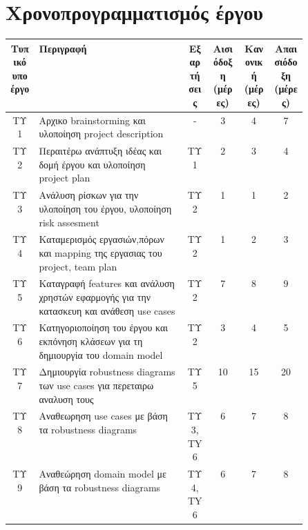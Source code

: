 \documentclass[11pt]{scrartcl} %
\begin{document}
\section{Χρονοπρογραμματισμός έργου}
\begin{table}[ht]
\centering
\resizebox{\textwidth}{!}
{
\Large
\begin{tabular}{|c | p{0.5\linewidth} | c | c | c | c |}
\hline
Τυπικό υποέργο & Περιγραφή                                                                                                         & Εξαρτήσεις & Αισιόδοξη (μέρες) & Κανονική (μέρες) & Απαισιόδοξη (μέρες) \\ \hline
ΤΥ1            & Αρχικο brainstorming και υλοποίηση   project description                                                          & -          & 3         & 4        & 7           \\ \hline
TΥ2            & Περαιτέρω   ανάπτυξη ιδέας και δομή έργου και υλοποίηση project plan                                              & ΤΥ1        & 2         & 3        & 4           \\ \hline
TΥ3            & Ανάλυση ρίσκων   για την υλοποίηση του έργου, υλοποίηση risk assesment                                            & ΤΥ2        & 1         & 1        & 2           \\ \hline
TΥ4            & Καταμερισμός εργασιών,πόρων   και mapping της εργασιας του project, team plan                                     & ΤΥ2        & 1         & 2        & 3           \\ \hline
TΥ5            & Καταγραφή features και ανάλυση χρηστών εφαρμογής για την   κατασκευη και ανάθεση use cases                        & ΤΥ2        & 7         & 8        & 9           \\ \hline
TΥ6            & Κατηγοριοποίηση   του έργου και εκπόνηση κλάσεων για τη δημιουργία του domain model                               & TΥ2        & 3         & 4        & 5           \\ \hline
TΥ7            & Δημιουργία robustness diagrams των use cases για περεταιρω   αναλυση τους                                         & TΥ5        & 10        & 15       & 20          \\ \hline
TΥ8            & Αναθεωρηση use   cases με βάση τα robustness diagrams                                                             & TΥ3, TY6   & 6         & 7        & 8           \\ \hline
TΥ9            & Αναθεώρηση domain model με βάση τα   robustness diagrams                                                          & ΤΥ4, TY6   & 6         & 7        & 8           \\ \hline

\end{tabular}}
\end{table}
\end{document}
